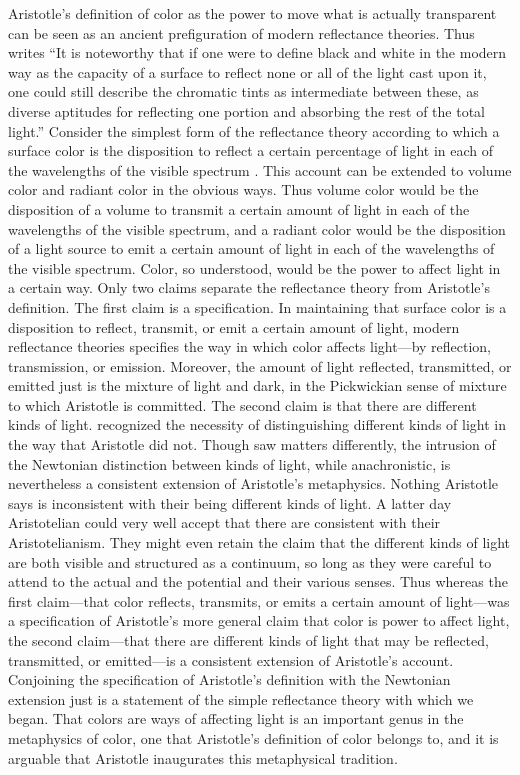 Aristotle's definition of color as the power to move what is actually transparent can be seen as an ancient prefiguration of modern reflectance theories. Thus \citet[23]{Ross:1906fk} writes ``It is noteworthy that if one were to define black and white in the modern way as the capacity of a surface to reflect none or all of the light cast upon it, one could still describe the chromatic tints as intermediate between these, as diverse aptitudes for reflecting one portion and absorbing the rest of the total light.'' Consider the simplest form of the reflectance theory according to which a surface color is the disposition to reflect a certain percentage of light in each of the wavelengths of the visible spectrum \citep[see][]{Hilbert:1987jq}. This account can be extended to volume color and radiant color in the obvious ways. Thus volume color would be the disposition of a volume to transmit a certain amount of light in each of the wavelengths of the visible spectrum, and a radiant color would be the disposition of a light source to emit a certain amount of light in each of the wavelengths of the visible spectrum. Color, so understood, would be the power to affect light in a certain way. Only two claims separate the reflectance theory from Aristotle's definition. The first claim is a specification. In maintaining that surface color is a disposition to reflect, transmit, or emit a certain amount of light, modern reflectance theories specifies the way in which color affects light---by reflection, transmission, or emission. Moreover, the amount of light reflected, transmitted, or emitted just is the mixture of light and dark, in the Pickwickian sense of mixture to which Aristotle is committed. The second claim is that there are different kinds of light. \citet{Newton:1704qv} recognized the necessity of distinguishing different kinds of light in the way that Aristotle did not. Though \citet{Goethe:1810uq} saw matters differently, the intrusion of the Newtonian distinction between kinds of light, while anachronistic, is nevertheless a consistent extension of Aristotle's metaphysics. Nothing Aristotle says is inconsistent with their being different kinds of light. A latter day Aristotelian could very well accept that there are consistent with their Aristotelianism. They might even retain the claim that the different kinds of light are both visible and structured as a continuum, so long as they were careful to attend to the actual and the potential and their various senses. Thus whereas the first claim---that color reflects, transmits, or emits a certain amount of light---was a specification of Aristotle's more general claim that color is power to affect light, the second claim---that there are different kinds of light that may be reflected, transmitted, or emitted---is a consistent extension of Aristotle's account. Conjoining the specification of Aristotle's definition with the Newtonian extension just is a statement of the simple reflectance theory with which we began. That colors are ways of affecting light is an important genus in the metaphysics of color, one that Aristotle's definition of color belongs to, and it is arguable that Aristotle inaugurates this metaphysical tradition.

